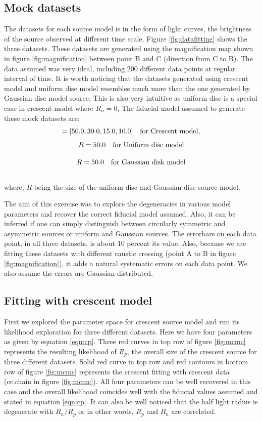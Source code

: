 \subsection{Mock datasets}
The datasets for each source model is in the form of light curves, the brightness of the source observed at different time scale. Figure \ref{fig:datafitting} shows the three datasets. These datasets are generated using the magnification map shown in figure \ref{fig:magnification} between point B and C (direction from C to B). The data assumed was very  ideal, including 200 different data points at regular interval of time. It is worth noticing that the datasets generated using crescent model and uniform disc model resembles much more than the one generated by Gaussian disc model source. This is also very intuitive as uniform disc is a special case in crescent model where $R_n=0$, The fiducial model assumed to generate these mock datasets are:
\begin{equation}
	[R_p, R_n, a, b] = [50.0, 30.0, 15.0, 10.0]  \ \ \ \rm{for\ Crescent\ model},
	\label{eqn:cp}
\end{equation}
\begin{equation}
	R = 50.0 \ \ \ \rm{for\ Uniform\ disc\ model}
\end{equation}

\begin{equation}
	R = 50.0 \ \ \ \rm{for\ Gaussian\ disk\ model}
\end{equation}
\\
where, $R$ being the size of the uniform disc and Gaussian disc source model.

The aim of this exercise was to explore the degeneracies in  various model parameters and recover the correct fiducial model assumed. Also, it can be inferred if one can simply distinguish between circularly symmetric and asymmetric sources or uniform and Gaussian sources.
The errorbars on each data point, in all three datasets, is about 10 percent its value. Also, because we are fitting these datasets with different caustic crossing (point A to B in figure \ref{fig:magnification}), it adds a natural systematic errors on each data point. We also assume the errors are Gaussian distributed.


\subsection{Fitting with crescent model}
First we explored the parameter space for crescent source model and run its likelihood exploration for three different datasets. Here we have four parameters as given by equation \ref{eqn:cp}. Three red curves in top row of figure \ref{fig:mcmc} represents the resulting likelihood of $R_p$, the overall size of the crescent source for three different datasets. Solid red curve in top row and red contours in bottom row of figure \ref{fig:mcmc} represents the crescent fitting with crescent data (cc.chain in figure \ref{fig:mcmc}). All four parameters can be well recovered in this case and the overall likelihood coincides well with the fiducial values assumed and stated in equation \ref{eqn:cp}. It can also be well noticed that the half light radius is degenerate with $R_n/R_p$ or in other words, $R_p$ and $R_n$ are correlated.

